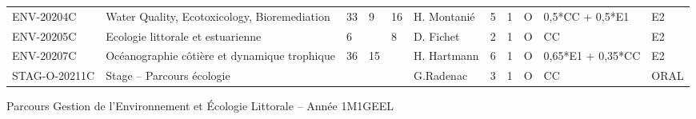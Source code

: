 \documentclass[a4paper,11pt]{article}
\begin{document}
{{\begin{tabular}{lllllllllll}
ENV-20204C                     & Water Quality, Ecotoxicology, Bioremediation                                              & 33                        & 9                         & 16                        & H. Montanié                        & 5                           & 1                           & O                                  & 0,5*CC + 0,5*E1                  & E2                               \\
ENV-20205C                     & Ecologie littorale et estuarienne                                                         & 6                         &                           & 8                         & D. Fichet                          & 2                           & 1                           & O                                  & CC                               & E2                               \\
ENV-20207C                     & Océanographie côtière et dynamique trophique                                              & 36                        & 15                        &                           & H. Hartmann                        & 6                           & 1                           & O                                  & 0,65*E1 + 0,35*CC                & E2                               \\
STAG-O-20211C                  & Stage – Parcours écologie                                                                 &                           &                           &                           & G.Radenac                          & 3                           & 1                           & O                                  & CC                               & ORAL                             \\ \hline
\end{tabular}}
}{Parcours Gestion de l'Environnement et Écologie Littorale -- Année 1}{M1GEEL}
\end{document}
